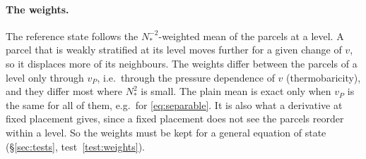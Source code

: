 \documentclass[11pt,a4paper]{article}
\begin{document}
\paragraph{The weights.} The reference state follows the $N_*^{-2}$-weighted mean of the parcels at a level. A parcel that is
weakly stratified at its level moves further for a given change of $v$, so it displaces more of its neighbours. The weights
differ between the parcels of a level only through $v_P$, i.e.\ through the pressure dependence of $v$ (thermobaricity), and
they differ most where $N_*^2$ is small. The plain mean is exact only when $v_P$ is the same for all of them, e.g.\ for
\eqref{eq:separable}. It is also what a derivative at fixed placement gives, since a fixed placement does not see the parcels reorder
within a level. So the weights must be kept for a general equation of state (\S\ref{sec:tests}, test~\ref{test:weights}).
\end{document}

